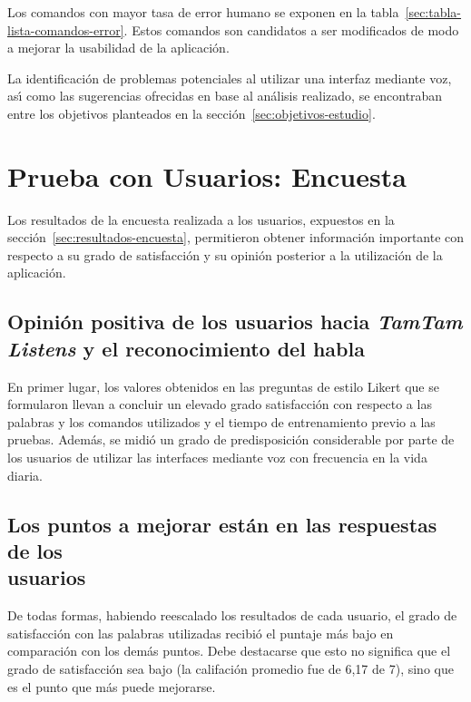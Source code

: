 Los comandos con mayor tasa de error humano se exponen en la tabla~\ref{sec:tabla-lista-comandos-error}.
Estos comandos son candidatos a ser modificados de modo a mejorar la usabilidad de la
aplicaci\'on.

La identificaci\'on de problemas potenciales al utilizar una interfaz mediante voz, as{\'\i} como 
las sugerencias ofrecidas en base al an\'alisis realizado, se encontraban entre los objetivos planteados 
en la secci\'on~\ref{sec:objetivos-estudio}.

\section{Prueba con Usuarios: Encuesta}
Los resultados de la encuesta realizada a los usuarios, expuestos en la secci\'on~\ref{sec:resultados-encuesta},
permitieron obtener informaci\'on importante con respecto a su grado de satisfacci\'on y su opini\'on 
posterior a la utilizaci\'on de la aplicaci\'on.

\subsection[Opini\'on positiva de los usuarios hacia \emph{TamTam Listens} y el \\ reconocimiento del habla]
{Opini\'on positiva de los usuarios hacia \emph{TamTam Listens} y el reconocimiento del habla}
En primer lugar, los valores obtenidos en las preguntas de estilo Likert que se formularon
llevan a concluir un elevado grado satisfacci\'on con respecto a las palabras y los comandos
utilizados y el tiempo de entrenamiento previo a las pruebas.
Adem\'as, se midi\'o un grado de predisposici\'on considerable por parte de los usuarios de utilizar
las interfaces mediante voz con frecuencia en la vida diaria.

\subsection[Los puntos a mejorar est\'an en las respuestas de los usuarios]
{Los puntos a mejorar est\'an en las respuestas de los \\ usuarios}
De todas formas, habiendo reescalado los resultados de cada usuario, el grado de satisfacci\'on
con las palabras utilizadas recibi\'o el puntaje m\'as bajo en comparaci\'on con los dem\'as puntos.
Debe destacarse que esto no significa que el grado de satisfacci\'on sea bajo (la califaci\'on promedio
fue de 6,17 de 7), sino que es el punto que m\'as puede mejorarse.

